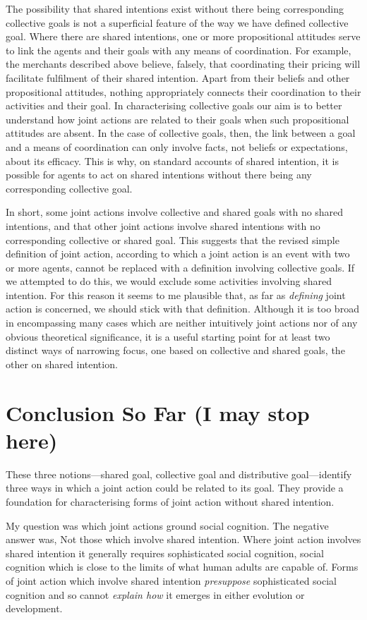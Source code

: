 \documentclass[12pt,a4paper]{extarticle}
\begin{document}
The possibility that shared intentions exist without there being corresponding collective goals is not a superficial feature of the way we have defined collective goal.  
Where there are shared intentions, one or more propositional attitudes serve to link the agents and their goals with any  means of coordination.  
For example, the merchants described above believe, falsely, that coordinating their pricing will facilitate fulfilment of their shared intention.  
Apart from their beliefs and other propositional attitudes, nothing appropriately connects their coordination to their activities and their goal.
In characterising collective goals our aim is to better understand how joint actions are related to their goals when such propositional attitudes are absent.  
In the case of collective goals, then, the link between a goal and a means of coordination can only involve facts, not beliefs or expectations, about its efficacy.
This is why, on standard accounts of shared intention, it is possible for agents to act on shared intentions without there being any corresponding collective goal.  

In short, some joint actions involve collective and shared goals with no shared intentions,
and that other joint actions involve shared intentions with no corresponding collective or shared goal.
This suggests that the revised simple definition of joint action, according to which a joint action is an event with two or more agents, cannot be replaced with a definition involving collective goals.
If we attempted to do this, we would exclude some activities involving shared intention.
For this reason it seems to me plausible that, as far as \emph{defining} joint action is concerned, we should stick with that definition.
Although it is too broad in encompassing many cases which are neither intuitively joint actions nor of any obvious theoretical significance,
it is a useful starting point for at least two distinct ways of narrowing focus, one based on collective and shared goals, the other on shared intention.


\section{Conclusion So Far (I may stop here)}
These three notions---shared goal, collective goal and distributive goal---identify three ways in which a joint action could be related to its goal.
They provide a foundation for characterising forms of joint action without shared intention.

My question was which joint actions ground social cognition.
The negative answer was, Not those which involve shared intention.
Where joint action involves shared intention it generally requires sophisticated social cognition, social cognition which is close to the limits of what human adults are capable of.
Forms of joint action which involve shared intention \emph{presuppose} sophisticated social cognition and so cannot \emph{explain how} it emerges in either evolution or development.
\end{document}
